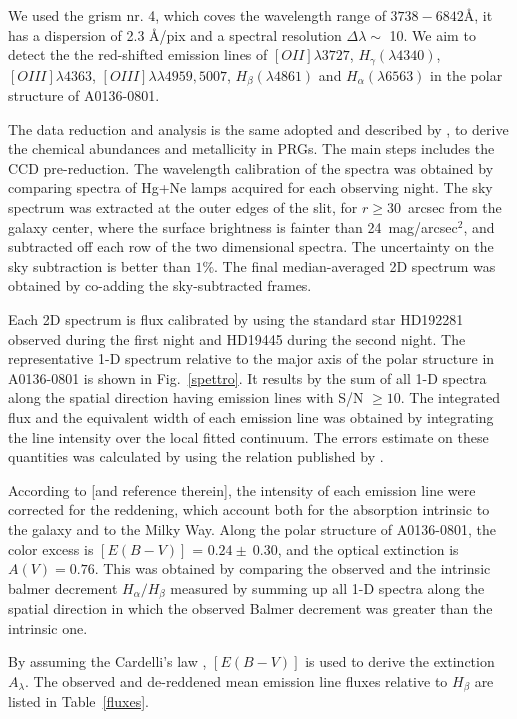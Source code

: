 \documentclass[useAMS,usenatbib]{mn2e}
\begin{document}
We used the grism nr. 4, which coves the wavelength range of
  $3738-6842$\AA, it has a dispersion of 2.3 \AA/pix and a spectral
  resolution $\Delta \lambda \sim$ 10. We aim to detect the the
  red-shifted emission lines of $[OII]\lambda3727$,
  $H_{\gamma}(\lambda4340)$, $[OIII]\lambda4363$,
  $[OIII]\lambda\lambda4959,5007$, $H_{\beta}(\lambda4861)$ and
  $H_{\alpha}(\lambda6563)$ in the polar structure of A0136-0801.

The data reduction and analysis is the same adopted and described by
\citet{Spav10,Spav11, Spav13}, to derive the chemical abundances and
metallicity in PRGs. The main steps includes the CCD
pre-reduction. The wavelength calibration of the spectra was obtained
by comparing spectra of Hg+Ne lamps acquired for each observing
night. The sky spectrum was extracted at the outer edges of the slit,
for $r \ge 30$~arcsec from the galaxy center, where the surface
brightness is fainter than 24~mag/arcsec$^2$, and subtracted off each
row of the two dimensional spectra. The uncertainty on the sky
subtraction is better than $1\%$.  The final median-averaged 2D
spectrum was obtained by co-adding the sky-subtracted frames.

Each 2D spectrum is flux calibrated by using the standard star
HD192281 observed during the first night and HD19445 during the second
night.  The representative 1-D spectrum relative to the major axis of
the polar structure in A0136-0801 is shown in Fig.~\ref{spettro}. It
results by the sum of all 1-D spectra along the spatial direction
having emission lines with S/N $\ge10$.  The integrated flux and the
equivalent width of each emission line was obtained by integrating the
line intensity over the local fitted continuum. The errors estimate on
these quantities was calculated by using the relation published by
\citet{Per03}.

According to \citet {Spav13} [and reference therein], the intensity of
each emission line were corrected for the reddening, which account
both for the absorption intrinsic to the galaxy and to the Milky Way.
Along the polar structure of A0136-0801, the color excess is
$[E(B-V)]$ = $0.24 \pm\ 0.30$, and the optical extinction is
$A(V)=0.76$. This was obtained by comparing the observed and the
intrinsic balmer decrement $H_{\alpha}/H_{\beta}$ measured by summing
up all 1-D spectra along the spatial direction in which the observed
Balmer decrement was greater than the intrinsic one.

By assuming the Cardelli's law \citep{Car89}, $[E(B-V)]$ is used to derive the extinction $A_{\lambda}$. 
The observed and de-reddened mean emission line fluxes relative to $H_{\beta}$ are listed in Table~\ref{fluxes}.
\end{document}
